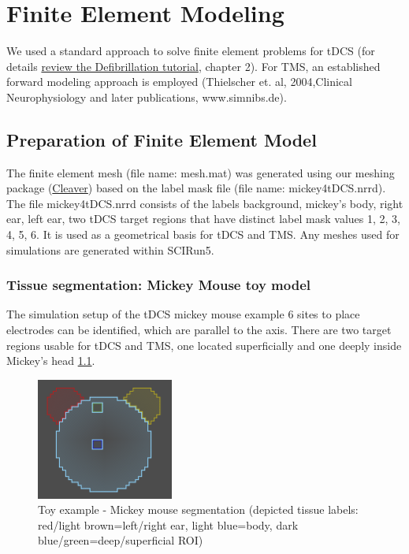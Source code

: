 \documentclass[fleqn,11pt,openany]{book}
\begin{document}
\chapter{Finite Element Modeling}

We used a standard approach to solve finite element problems for tDCS (for details
\href{http://www.sci.utah.edu/devbuilds/scirun_docs/DefibrillationTutorial.pdf}{review the Defibrillation tutorial}, chapter 2).
For TMS, an established forward modeling approach is employed (Thielscher et. al, 2004,Clinical Neurophysiology and later publications, www.simnibs.de).

\section{Preparation of Finite Element Model}

The finite element mesh (file name: mesh.mat) was generated using our meshing package
(\href{http://www.sci.utah.edu/cibc-software/cleaver-cibc.html}{Cleaver}) based on the label mask file (file name: mickey4tDCS.nrrd).
The file mickey4tDCS.nrrd consists of the labels background, mickey's body, right ear, left ear, two tDCS target regions that have distinct label mask values 1, 2, 3, 4, 5, 6.
It is used as a geometrical basis for tDCS and TMS. Any meshes used for simulations are generated within SCIRun5.

\subsection{Tissue segmentation: Mickey Mouse toy model}
The simulation setup of the tDCS mickey mouse example 6 sites to place electrodes can be identified, which are parallel to the axis.
There are two target regions usable for tDCS and TMS, one located superficially and one deeply inside Mickey's head \ref{fig:sim_setting}.

\begin{figure}[!h]
\centering
\includegraphics[width=0.4\textwidth]{BrainStimulation_figures/mickey_mouse_seg.png}
\caption{ Toy example - Mickey mouse segmentation (depicted tissue labels: red/light brown=left/right ear, light blue=body, dark blue/green=deep/superficial ROI) }
\label{fig:sim_setting}
\end{figure}
\end{document}
